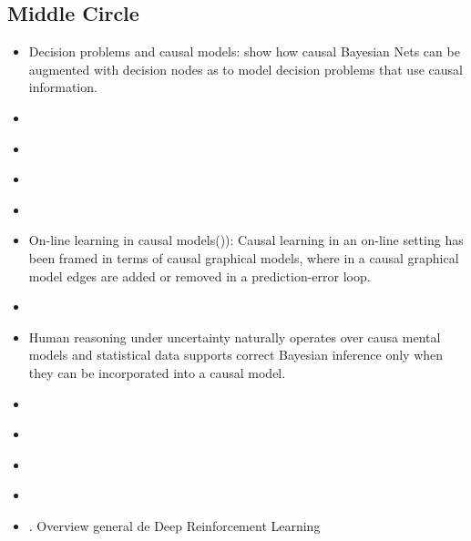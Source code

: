 \documentclass[11pt]{article}
\theoremstyle{plain}
\begin{document}
\subsection{Middle Circle}
\begin{itemize}
\item Decision problems and causal models: \cite{dawid2002influence} show how causal Bayesian Nets can be augmented with decision nodes as to model decision problems that use causal information.
\item \cite{hagmayer2009decision}
\item \cite{meder2009role}
\item \cite{meder2010observing}
\item \cite{kemp2010learning}
\item On-line learning in causal models(\cite{wellen2012learning})):  Causal learning in an on-line setting has been framed in terms of causal graphical models, where in a causal graphical model edges are added or removed in a prediction-error loop.

\item \cite{lopez2015towards}
\item \cite{krynski2007role} Human reasoning under uncertainty naturally operates over causa mental models and statistical data supports correct Bayesian inference only when they can be incorporated into a causal model. 
\item \cite{van2016deep}
\item \cite{goudet2017learning}
\item \cite{leibo2017multi}
\item \cite{hernandez2017survey}
\item \cite{li2017deep}. Overview general de Deep Reinforcement Learning

\end{itemize}
\end{document}
